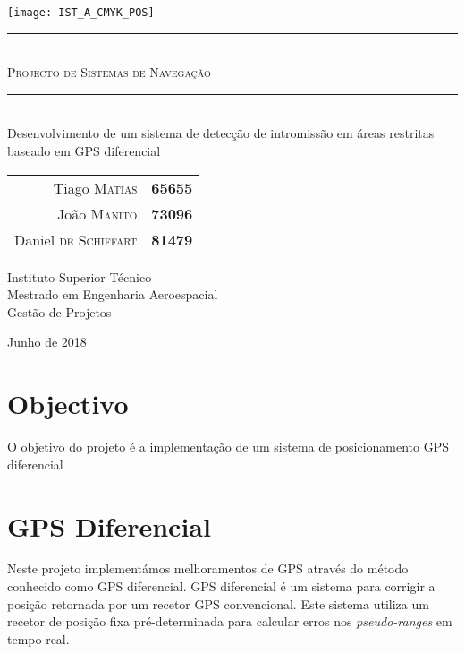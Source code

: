 \documentclass{article}
\begin{document}
\thispagestyle{empty}

\texttt{[image: IST\_A\_CMYK\_POS]}
	
\begin{center}
	\vspace{70mm} %
	\rule{\linewidth}{0.5pt} \\
    \vspace{2mm}
	\Huge \textsc{Projecto de Sistemas de Navegação} \\
	\rule{\linewidth}{2pt} \\
	\vspace{8mm} %
	\LARGE Desenvolvimento de um sistema de detecção de intromissão em áreas restritas baseado em GPS diferencial
	
	\vspace{\fill} %
	\large
	
	\begin{tabular}{r l}
		Tiago \textsc{Matias} & \textbf{65655} \\
		João \textsc{Manito} & \textbf{73096} \\
		Daniel \textsc{de Schiffart} & \textbf{81479}
	\end{tabular}
	
	\vspace{10mm} %
	\Large Instituto Superior Técnico \\
	Mestrado em Engenharia Aeroespacial \\
	\vspace{1mm}
	\large Gestão de Projetos
	
	\vspace{10mm} %
	\Large Junho de 2018
\end{center}

\newpage

\section{Objectivo}

O objetivo do projeto é a implementação de um sistema de
posicionamento GPS diferencial

\section{GPS Diferencial}

Neste projeto implementámos melhoramentos de GPS através do método
conhecido como GPS diferencial. GPS diferencial é um sistema para
corrigir a posição retornada por um recetor GPS convencional. Este
sistema utiliza um recetor de posição fixa pré-determinada para
calcular erros nos \textit{pseudo-ranges} em tempo real.
\end{document}
